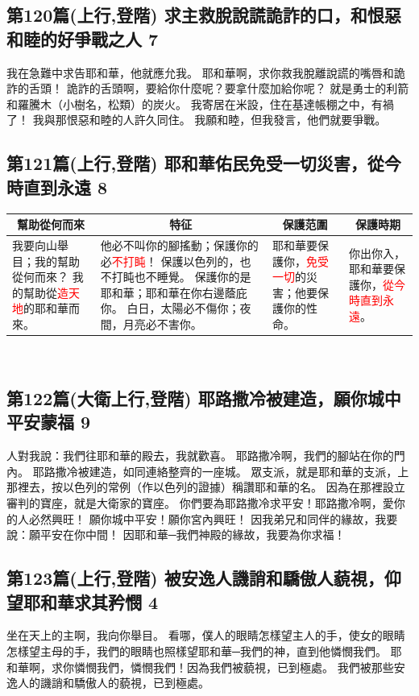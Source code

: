 \subsection{第120篇(上行,登階) 求主救脫說謊詭詐的口，和恨惡和睦的好爭戰之人 7}
我在急難中求告耶和華，他就應允我。
耶和華啊，求你救我脫離說謊的嘴唇和詭詐的舌頭！
詭詐的舌頭啊，要給你什麼呢？要拿什麼加給你呢？
就是勇士的利箭和羅騰木（小樹名，松類）的炭火。
我寄居在米設，住在基達帳棚之中，有禍了！
我與那恨惡和睦的人許久同住。
我願和睦，但我發言，他們就要爭戰。


\subsection{第121篇(上行,登階) 耶和華佑民免受一切災害，從今時直到永遠 8}
\begin{table}[H]
\centering
\begin{tabular}{p{}|p{6.500cm}|p{3.25cm}|p{2.75cm}}\hline\hline
\multicolumn{1}{c|}{幫助從何而來}&\multicolumn{1}{c|}{特征}&\multicolumn{1}{c|}{保護范圍}&\multicolumn{1}{c}{保護時期}\\\hline
我要向山舉目；我的幫助從何而來？
我的幫助從\textcolor{red}{造天地}的耶和華而來。
&他必不叫你的腳搖動；保護你的必\textcolor{red}{不打盹}！
保護以色列的，也不打盹也不睡覺。
保護你的是耶和華；耶和華在你右邊蔭庇你。
白日，太陽必不傷你；夜間，月亮必不害你。
&耶和華要保護你，\textcolor{red}{免受一切}的災害；他要保護你的性命。
&你出你入，耶和華要保護你，\textcolor{red}{從今時直到永遠}。\\\hline
\end{tabular}
\end{table} 



\subsection{第122篇(大衛上行,登階) 耶路撒冷被建造，願你城中平安蒙福 9}
人對我說：我們往耶和華的殿去，我就歡喜。
耶路撒冷啊，我們的腳站在你的門內。
耶路撒冷被建造，如同連絡整齊的一座城。
眾支派，就是耶和華的支派，上那裡去，按以色列的常例（作以色列的證據）稱讚耶和華的名。
因為在那裡設立審判的寶座，就是大衛家的寶座。
你們要為耶路撒冷求平安！耶路撒冷啊，愛你的人必然興旺！
願你城中平安！願你宮內興旺！
因我弟兄和同伴的緣故，我要說：願平安在你中間！
因耶和華─我們神殿的緣故，我要為你求福！


\subsection{第123篇(上行,登階) 被安逸人譏誚和驕傲人藐視，仰望耶和華求其矜憫 4}
坐在天上的主啊，我向你舉目。
看哪，僕人的眼睛怎樣望主人的手，使女的眼睛怎樣望主母的手，我們的眼睛也照樣望耶和華─我們的神，直到他憐憫我們。
耶和華啊，求你憐憫我們，憐憫我們！因為我們被藐視，已到極處。
我們被那些安逸人的譏誚和驕傲人的藐視，已到極處。

